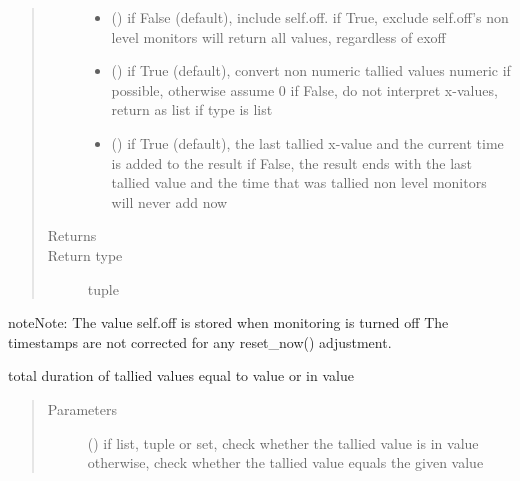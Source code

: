 \documentclass[letterpaper,10pt,english]{sphinxmanual}
\begin{document}
\begin{fulllineitems}
\begin{fulllineitems}
\begin{quote}
\begin{description}
\begin{itemize}
\item {} 
 () \textendash{} if False (default), include self.off. if True, exclude self.off’s 
non level monitors will return all values, regardless of exoff

\item {} 
 () \textendash{} if True (default), convert non numeric tallied values numeric if possible, otherwise assume 0 
if False, do not interpret x-values, return as list if type is list

\item {} 
 () \textendash{} if True (default), the last tallied x-value and the current time is added to the result 
if False, the result ends with the last tallied value and the time that was tallied 
non level monitors will never add now

\end{itemize}

\item[{Returns}] \leavevmode
{}

\item[{Return type}] \leavevmode
tuple

\end{description}\end{quote}

\begin{sphinxadmonition}{note}{Note:}
The value self.off is stored when monitoring is turned off 
The timestamps are not corrected for any reset\_now() adjustment.
\end{sphinxadmonition}

\end{fulllineitems}


\begin{fulllineitems}
\label{\detokenize{Reference:salabim.Monitor.value_duration}}
total duration of tallied values equal to value or in value
\begin{quote}\begin{description}
\item[{Parameters}] \leavevmode
{} () \textendash{} if list, tuple or set, check whether the tallied value is in value 
otherwise, check whether the tallied value equals the given value


\end{description}
\end{quote}
\end{fulllineitems}
\end{fulllineitems}
\end{document}
